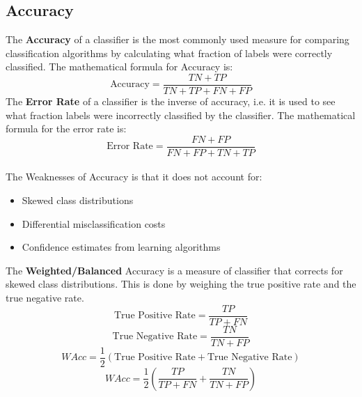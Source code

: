 \documentclass[12pt, a4paper]{book}
\begin{document}
\subsection{Accuracy}
The \textbf{Accuracy} of a classifier is the most commonly used measure for comparing classification algorithms by calculating what fraction of labels were correctly classified. The mathematical formula for Accuracy is:
$$\text{Accuracy} = \frac{TN+TP}{TN+TP+FN+FP}$$
The \textbf{Error Rate} of a classifier is the inverse of accuracy, i.e. it is used to see what fraction labels were incorrectly classified by the classifier. The mathematical formula for the error rate is:
$$\text{Error Rate} = \frac{FN+FP}{FN+FP+TN+TP}$$\\
The Weaknesses of Accuracy is that it does not account for:
\begin{itemize}
    \item Skewed class distributions
    \item Differential misclassification costs
    \item Confidence estimates from learning algorithms\\
\end{itemize}
The \textbf{Weighted/Balanced} Accuracy is a measure of classifier that corrects for skewed class distributions. This is done by weighing the true positive rate and the true negative rate.
$$\text{True Positive Rate} = \frac{TP}{TP+FN}$$
$$\text{True Negative Rate} = \frac{TN}{TN+FP}$$
$$WAcc = \frac{1}{2}\left(\text{True Positive Rate} + \text{True Negative Rate}\right)$$
$$WAcc = \frac{1}{2}\left(\frac{TP}{TP+FN} + \frac{TN}{TN+FP}\right)$$
\end{document}
